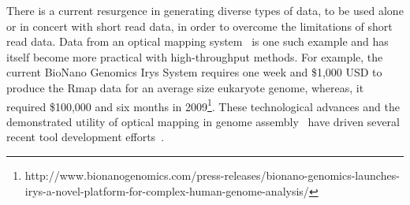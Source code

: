 


There is a current resurgence in generating diverse types of data, to be used alone or in concert with short read data, in order to overcome the limitations of short read data.  Data from an optical mapping system~\cite{ORMenc,microfluidic} is one such example and has itself become more practical with high-throughput methods.  For example, the current BioNano Genomics Irys System requires one week and \$1,000 USD to produce the Rmap data for an average size eukaryote genome, whereas, it required \$100,000 and six months in 2009\footnote{http://www.bionanogenomics.com/press-releases/bionano-genomics-launches-irys-a-novel-platform-for-complex-human-genome-analysis/}. These technological advances and the demonstrated utility of optical mapping in genome assembly~\cite{reslewic,zhou,zhou2,amborella,GOAT} have driven several recent tool development efforts~\cite{optima,omblast,maligner}.

